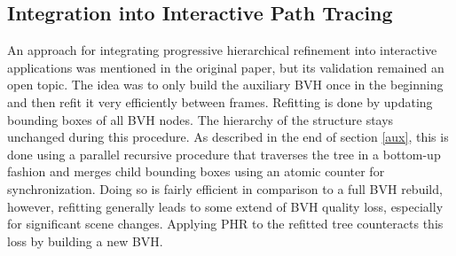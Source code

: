 \subsection{Integration into Interactive Path Tracing}
\label{phr_in_interactive}
An approach for integrating progressive hierarchical refinement into interactive applications was mentioned in the original paper\cite{hendrich_parallel_2017}, but its validation remained an open topic. The idea was to only build the auxiliary BVH once in the beginning and then refit it very efficiently between frames. Refitting is done by updating bounding boxes of all BVH nodes. The hierarchy of the structure stays unchanged during this procedure. As described in the end of section \ref{aux}, this is done using a parallel recursive procedure that traverses the tree in a bottom-up fashion and merges child bounding boxes using an atomic counter for synchronization. Doing so is fairly efficient in comparison to a full BVH rebuild, however, refitting generally leads to some extend of BVH quality loss, especially for significant scene changes. Applying PHR to the refitted tree counteracts this loss by building a new BVH.
\cleardoublepage